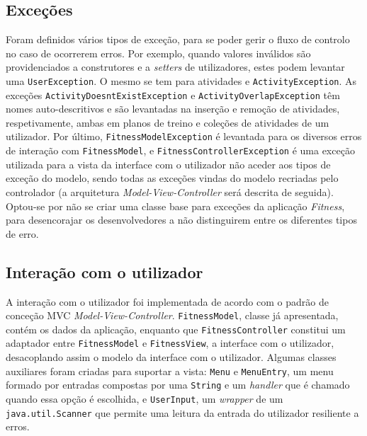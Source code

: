 \documentclass[12pt, a4paper]{article}
\begin{document}
\subsection{Exceções}

Foram definidos vários tipos de exceção, para se poder gerir o fluxo de controlo no caso de
ocorrerem erros. Por exemplo, quando valores inválidos são providenciados a construtores e a
\emph{setters} de utilizadores, estes podem levantar uma \texttt{UserException}. O mesmo se tem para
atividades e \texttt{ActivityException}. As exceções \texttt{ActivityDoesntExistException} e
\texttt{ActivityOverlapException} têm nomes auto-descritivos e são levantadas na inserção e remoção
de atividades, respetivamente, ambas em planos de treino e coleções de atividades de um utilizador.
Por último, \texttt{FitnessModelException} é levantada para os diversos erros de interação com
\texttt{FitnessModel}, e \texttt{FitnessControllerException} é uma exceção utilizada para a vista
da interface com o utilizador não aceder aos tipos de exceção do modelo, sendo todas as exceções
vindas do modelo recriadas pelo controlador (a arquitetura \emph{Model-View-Controller} será
descrita de seguida). Optou-se por não se criar uma classe base para exceções da aplicação
\emph{Fitness}, para desencorajar os desenvolvedores a não distinguirem entre os diferentes tipos de
erro.

\subsection{Interação com o utilizador}

A interação com o utilizador foi implementada de acordo com o padrão de conceção MVC
\emph{Model-View-Controller}. \texttt{FitnessModel}, classe já apresentada, contém os dados da
aplicação, enquanto que \texttt{FitnessController} constitui um adaptador entre
\texttt{FitnessModel} e \texttt{FitnessView}, a interface com o utilizador, desacoplando assim o
modelo da interface com o utilizador. Algumas classes auxiliares foram criadas para suportar a
vista: \texttt{Menu} e \texttt{MenuEntry}, um menu formado por entradas compostas por uma
\texttt{String} e um \emph{handler} que é chamado quando essa opção é escolhida, e
\texttt{UserInput}, um \emph{wrapper} de um \texttt{java.util.Scanner} que permite uma leitura da
entrada do utilizador resiliente a erros.
\end{document}
